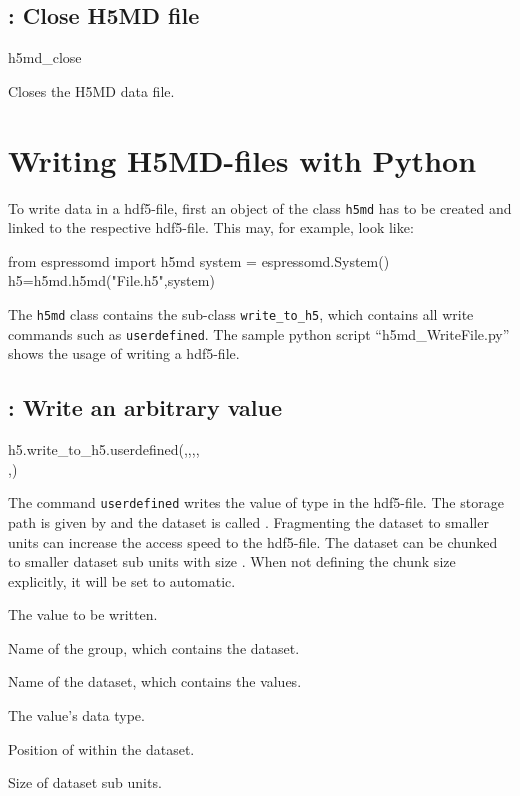 \subsection{: Close H5MD file}

\begin{essyntax}
h5md_close
\end{essyntax}
Closes the H5MD data file.


\section{Writing H5MD-files with Python}
To write data in a hdf5-file, first an object of the class \texttt{h5md} has to be created and linked to the respective hdf5-file. This may, for example, look like:
\begin{pycode}
from espressomd import h5md
system = espressomd.System()
h5=h5md.h5md("File.h5",system)
\end{pycode}
The \texttt{h5md} class contains the sub-class \texttt{write_to_h5}, which contains all write commands such as \texttt{userdefined}. The sample python script ``h5md_WriteFile.py'' shows the usage of writing a hdf5-file.

\subsection{: Write an arbitrary value}
\begin{pyessyntax}
h5.write_to_h5.userdefined(,,,,\\,)
\end{pyessyntax}
The command \texttt{userdefined} writes the value  of type  in the hdf5-file. The storage path is given by  and the dataset is called . Fragmenting the dataset to smaller units can increase the access speed to the hdf5-file. The dataset can be chunked to smaller dataset sub units with size . When not defining the chunk size explicitly, it will be set to automatic.
\begin{arguments}
\item[\var{value}] The value to be written.
\item[\var{groupname}] Name of the group, which contains the dataset.
\item[\var{datasetname}] Name of the dataset, which contains the values.
\item[\var{datatype}] The value's data type.
\item[\var{datasetindex}] Position of  within the dataset.
\item[\var{chunks}] Size of dataset sub units. 
\end{arguments}

